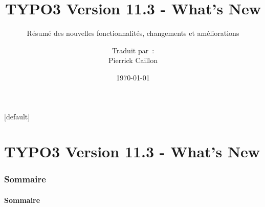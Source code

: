 \documentclass[t]{beamer}
\title{TYPO3 Version 11.3 - What's New}
\subtitle{Résumé des nouvelles fonctionnalités, changements et améliorations}
\author{
	\centerline{Traduit par~:}
	\centerline{Pierrick Caillon}
}
\date{\today}
\begin{document}
\sharefont


\begingroup
	[default]
	\begin{frame}
		\titlepage
	\end{frame}
\endgroup


\section*{TYPO3 Version 11.3 - What's New}
\begin{frame}[fragile]
	\frametitle{Sommaire}
	\framesubtitle{Sommaire}

	\tableofcontents

\end{frame}





















\end{document}
